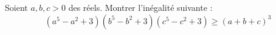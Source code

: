 Soient $a, b, c > 0$ des réels. Montrer l'inégalité suivante :
$$(a^5 - a^2 + 3)(b^5 - b^2 + 3)(c^5 - c^2 + 3) \ge (a + b + c)^3$$